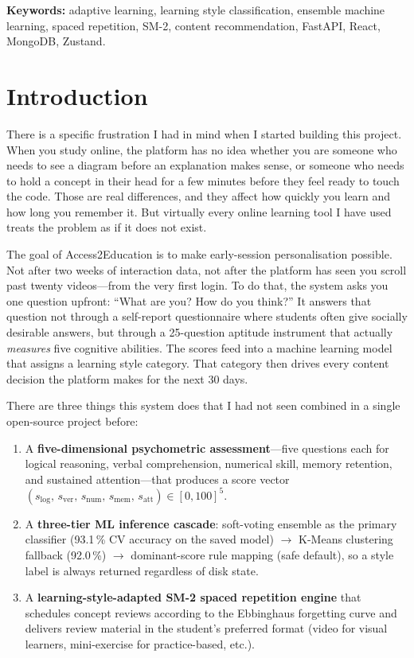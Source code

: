 \documentclass[12pt,a4paper]{article}
\begin{document}
\noindent\textbf{Keywords:} adaptive learning, learning style
classification, ensemble machine learning, spaced repetition, SM-2,
content recommendation, FastAPI, React, MongoDB, Zustand.

\newpage
\tableofcontents
\newpage

\section{Introduction}

There is a specific frustration I had in mind when I started building
this project. When you study online, the platform has no idea
whether you are someone who needs to see a diagram before an
explanation makes sense, or someone who needs to hold a concept in
their head for a few minutes before they feel ready to touch the
code. Those are real differences, and they affect how quickly
you learn and how long you remember it. But virtually every online
learning tool I have used treats the problem as if it does not exist.

The goal of Access2Education is to make early-session personalisation
possible. Not after two weeks of interaction data, not after the
platform has seen you scroll past twenty videos---from the very first
login. To do that, the system asks you one question upfront: ``What
are you? How do you think?'' It answers that question not through
a self-report questionnaire where students often give socially
desirable answers, but through a 25-question aptitude instrument that
actually \emph{measures} five cognitive abilities. The scores feed
into a machine learning model that assigns a learning style category.
That category then drives every content decision the platform makes
for the next 30 days.

There are three things this system does that I had not seen combined
in a single open-source project before:

\begin{enumerate}[leftmargin=*, label=(\arabic*)]
  \item A \textbf{five-dimensional psychometric assessment}---five
    questions each for logical reasoning, verbal comprehension,
    numerical skill, memory retention, and sustained attention---that
    produces a score vector
    $(s_{\text{log}},\,s_{\text{ver}},\,s_{\text{num}},\,
    s_{\text{mem}},\,s_{\text{att}}) \in [0,100]^5$.
  \item A \textbf{three-tier ML inference cascade}:
    soft-voting ensemble as the primary classifier (93.1\,\% CV
    accuracy on the saved model) $\rightarrow$ K-Means clustering
    fallback (92.0\,\%) $\rightarrow$ dominant-score rule mapping
    (safe default), so a style label is always returned regardless of
    disk state.
  \item A \textbf{learning-style-adapted SM-2 spaced repetition
    engine} that schedules concept reviews according to the
    Ebbinghaus forgetting curve and delivers review material
    in the student's preferred format (video for visual learners,
    mini-exercise for practice-based, etc.).
\end{enumerate}
\end{document}
